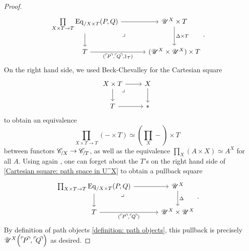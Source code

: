 \documentclass[twoside,a4paper,11pt]{amsart}
\begin{document}
\begin{proof}
\begin{equation}
    \begin{tikzcd}[column sep=large]
    {\prod\limits_{X\times T\to T}\Eq_{/X\times T}(P,Q)} \arrow[r] \arrow[d] \arrow[dr, phantom, "\lrcorner"{anchor=center, pos=0.125}] & {\U^X\times T} \arrow[d, "{\Delta\times T}"] \\
    T \arrow[r, "{(\corner{P},\corner{Q}, 1_T)}"'] & {(\U^X\times\U^X)\times T}
\end{tikzcd}.
\end{equation}
On the right hand side, we used Beck-Chevalley \cite[Lemma 2.1]{Frey&Rasekh_ConstructingCoproductsInLCCC} for the Cartesian square
\[\begin{tikzcd}
    {X \times T} \arrow[r] \arrow[d] \arrow[dr, phantom, "\lrcorner"{anchor=center, pos=0.125}] & X \arrow[d] \\
    T \arrow[r] & \ast
\end{tikzcd}\]
to obtain an equivalence \[\prod_{X\times T\to T} (-\times T)\simeq (\prod_X-)\times T\] between functors $\slice{\C}{X}\to\slice{\C}{T}$, as well as the equivalence $\prod_X (A\times X)\simeq A^X$ for all $A$. Using again , one can forget about the $T$'s on the right hand side of \eqref{Cartesian square: path space in U^X} to obtain a pullback square %
\[\begin{tikzcd}[column sep=large]
    {\prod_{X \times T \to T} \Eq_{/X \times T}(P,Q)} \arrow[r] \arrow[d] \arrow[dr, phantom, "\lrcorner"{anchor=center, pos=0.125}] & {\U^X} \arrow[d, "\Delta"] \\
    T \arrow[r, "{(\corner{P}, \corner{Q})}"'] & {\U^X \times \U^X}
\end{tikzcd}.\]
By definition of path objects \eqref{definition: path objects}, this pullback is precisely $\U^X\Big(\corner{P},\corner{Q}\Big)$ as desired.
\end{proof}
\end{document}
